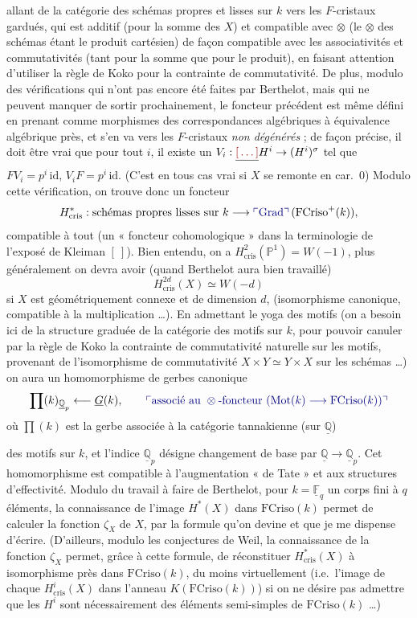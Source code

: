 \documentclass[11pt,a4paper]{article}
\begin{document}
allant de la catégorie des schémas propres et lisses sur $k$ vers les
$F$-cristaux gardués, \struck{\ill{}} \add{\ill{}} qui est additif (pour la
somme des $X$) et compatible avec $\otimes$ (le $\otimes$ des schémas étant le
produit cartésien) de façon compatible avec les associativités et
commutativités (tant pour la somme que pour le produit), en faisant attention
d'utiliser la règle de Koko pour la contrainte de commutativité. De plus,
modulo des vérifications qui n'ont pas encore été faites par Berthelot, mais
qui ne peuvent manquer de sortir prochainement, le foncteur précédent est
même défini en prenant comme morphismes des correspondances algébriques à
équivalence algébrique près, et s'en va vers les $F$-cristaux
\emph{non dégénérés} ; de façon précise, il doit être vrai que pour tout
$i$, il existe un $V_{i} : \struck{\ill{}} H^{i} \to (H^{i})^{\sigma}$ tel que
$F V_{i} = p^{i}\,\mathrm{id}$, $V_{i} F = p^{i}\,\mathrm{id}$. (C'est en tous
cas vrai si $X$ se remonte en car.\ $0$) Modulo cette vérification, on trouve
donc un foncteur
\[
H^{*}_{\mathrm{cris}} : \text{schémas propres lisses sur } k \longrightarrow
\add{\mathrm{Grad}}\,(\mathrm{FCriso}^{+}(k)) ,
\]
compatible à tout (un « foncteur cohomologique » dans la terminologie de
l'exposé de Kleiman $[\ ]$). Bien entendu, on a
$H^{2}_{\mathrm{cris}}(\mathbb{P}^{1}) = W(-1)$, plus généralement on devra
avoir (quand Berthelot aura bien travaillé)
\[
H^{2d}_{\mathrm{cris}}(X) \simeq W(-d)
\]
si $X$ est géométriquement connexe et de dimension $d$, (isomorphisme
canonique, compatible à la multiplication …). En admettant le yoga des
motifs (on a besoin ici de la structure graduée de la catégorie des motifs
sur $k$, pour pouvoir canuler par la règle de Koko la contrainte de
commutativité naturelle sur les motifs, provenant de l'isomorphisme de
commutativité $X \times Y \simeq Y \times X$ sur les schémas …) on aura
un homomorphisme de gerbes canonique
\[
\prod(k)_{\underline{\mathbb{Q}}_{p}} \longleftarrow \underline{G}(k) ,
\qquad \add{\text{associé au } \otimes\text{-foncteur }
(\mathrm{Mot}(k) \longrightarrow \mathrm{FCriso}(k))}
\]
où $\prod(k)$ est la gerbe associée à la catégorie tannakienne (sur
$\underline{\mathbb{Q}}$)

des motifs  sur $k$, et l'indice
$\underline{\mathbb{Q}}_{p}$ désigne  changement de base
par $\underline{\mathbb{Q}} \to \underline{\mathbb{Q}}_{p}$. Cet
homomorphisme est compatible à l'augmentation « de Tate » et aux structures
d'effectivité. Modulo du travail à faire de Berthelot, pour
$k = \underline{\mathbb{F}}_{q}$ un corps fini à $q$ éléments, la
connaissance de l'image \struck{\ill{}} $H^{*}(X)$ dans
$\mathrm{FCriso}(k)$ permet de calculer la fonction $\zeta_{X}$ de $X$, par
la formule qu'on devine et que je me dispense d'écrire. (D'ailleurs, modulo
les conjectures de Weil, la connaissance de la fonction $\zeta_{X}$ permet,
grâce à cette formule, de réconstituer $H^{*}_{\mathrm{cris}}(X)$ à
isomorphisme près dans $\mathrm{FCriso}(k)$, du moins virtuellement (i.e.\
l'image de chaque $H^{i}_{\mathrm{cris}}(X)$ dans l'anneau
$K(\mathrm{FCriso}(k))$) si on ne désire pas admettre que \struck{\ill{}} les
$H^{i}$ sont nécessairement des éléments semi-simples de
$\mathrm{FCriso}(k)$ …)
\end{document}
